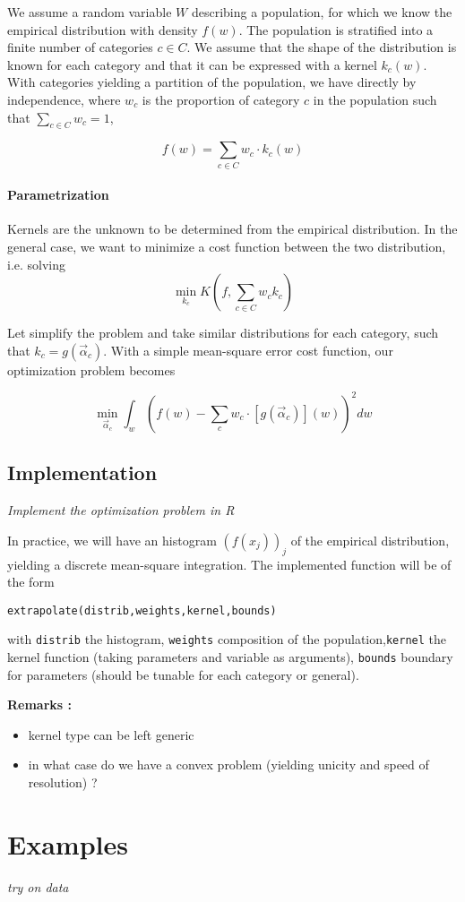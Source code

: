 We assume a random variable $W$ describing a population, for which we know the empirical distribution with density $f(w)$. The population is stratified into a finite number of categories $c\in C$. We assume that the shape of the distribution is known for each category and that it can be expressed with a kernel $k_c (w)$. With categories yielding a partition of the population, we have directly by independence, where $w_c$ is the proportion of category $c$ in the population such that $\sum_{c\in C} w_c = 1$,

\[
f(w) = \sum_{c\in C} w_c \cdot k_c (w)
\]

\paragraph{Parametrization}

Kernels are the unknown to be determined from the empirical distribution. In the general case, we want to minimize a cost function between the two distribution, i.e. solving
\[\min_{k_c} K(f,\sum_{c\in C} w_c k_c)\]

Let simplify the problem and take similar distributions for each category, such that $k_c = g(\vec{\alpha}_c)$. With a simple mean-square error cost function, our optimization problem becomes

\[
\min_{\vec{\alpha}_c} \int_w \left(f(w) - \sum_c w_c \cdot \left[ g(\vec{\alpha}_c)\right] (w) \right)^2 dw
\]


\subsection{Implementation}

\textit{Implement the optimization problem in R}

In practice, we will have an histogram $\left(f(x_j)\right)_j$ of the empirical distribution, yielding a discrete mean-square integration. The implemented function will be of the form

\texttt{extrapolate(distrib,weights,kernel,bounds)}

with \texttt{distrib} the histogram, \texttt{weights} composition of the population,\texttt{kernel} the kernel function (taking parameters and variable as arguments), \texttt{bounds} boundary for parameters (should be tunable for each category or general).

\medskip

\textbf{Remarks :}
\begin{itemize}
\item kernel type can be left generic
\item in what case do we have a convex problem (yielding unicity and speed of resolution) ?
\end{itemize}




\section{Examples}

\textit{try on data}











